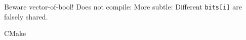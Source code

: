 \documentclass[11pt,headernav]{beamer}
\begin{document}
\begin{numberedframe}{Beware vector-of-bool!}
  Does not compile:
  More subtle:
  Different \lstinline{bits[i]} are falsely shared.
\end{numberedframe}

\begin{numberedframe}{CMake}
  
\end{numberedframe}
\end{document}
